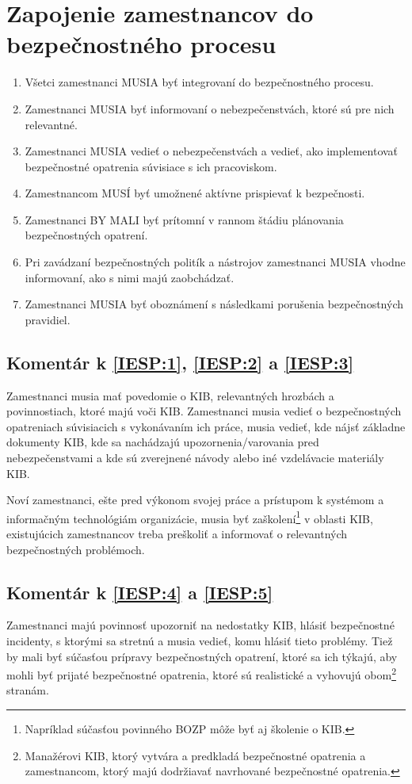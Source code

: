 \section{Zapojenie zamestnancov do bezpečnostného procesu}
\begin{enumerate}
  \item \label{IESP:1} Všetci zamestnanci MUSIA byť integrovaní do bezpečnostného procesu.
  \item \label{IESP:2} Zamestnanci MUSIA byť informovaní o nebezpečenstvách, ktoré sú pre nich relevantné.
  \item \label{IESP:3} Zamestnanci MUSIA vedieť o nebezpečenstvách a vedieť, ako implementovať bezpečnostné opatrenia súvisiace
    s ich pracoviskom.
  \item \label{IESP:4} Zamestnancom MUSÍ byť umožnené aktívne prispievať k bezpečnosti.
  \item \label{IESP:5} Zamestnanci BY MALI byť prítomní v rannom štádiu plánovania bezpečnostných opatrení.
  \item \label{IESP:6} Pri zavádzaní bezpečnostných politík a nástrojov zamestnanci MUSIA vhodne informovaní, ako s nimi
    majú zaobchádzať.
  \item \label{IESP:7} Zamestnanci MUSIA byť oboznámení s následkami porušenia bezpečnostných pravidiel.
\end{enumerate}

\subsection*{Komentár k \ref{IESP:1}, \ref{IESP:2} a \ref{IESP:3}}
Zamestnanci musia mať povedomie o KIB, relevantných hrozbách a povinnostiach, ktoré majú voči KIB. Zamestnanci musia vedieť
o bezpečnostných opatreniach súvisiacich s vykonávaním ich práce, musia vedieť, kde nájsť základne dokumenty KIB, kde sa
nachádzajú upozornenia/varovania pred nebezpečenstvami a kde sú zverejnené návody alebo iné vzdelávacie materiály KIB.

Noví zamestnanci, ešte pred výkonom svojej práce a prístupom k systémom a informačným technológiám organizácie, musia byť
zaškolení\footnote{Napríklad súčasťou povinného BOZP môže byť aj školenie o KIB.} v oblasti KIB, existujúcich
zamestnancov treba preškoliť a informovať o relevantných bezpečnostných problémoch.

\subsection*{Komentár k \ref{IESP:4} a \ref{IESP:5}}
Zamestnanci majú povinnosť upozorniť na nedostatky KIB, hlásiť bezpečnostné incidenty, s ktorými sa stretnú a musia vedieť,
komu hlásiť tieto problémy. Tiež by mali byť súčasťou prípravy bezpečnostných opatrení, ktoré sa ich týkajú, aby mohli byť
prijaté bezpečnostné opatrenia, ktoré sú realistické a vyhovujú obom\footnote{Manažérovi KIB, ktorý vytvára a predkladá
bezpečnostné opatrenia a zamestnancom, ktorý majú dodržiavať navrhované bezpečnostné opatrenia.} stranám.

